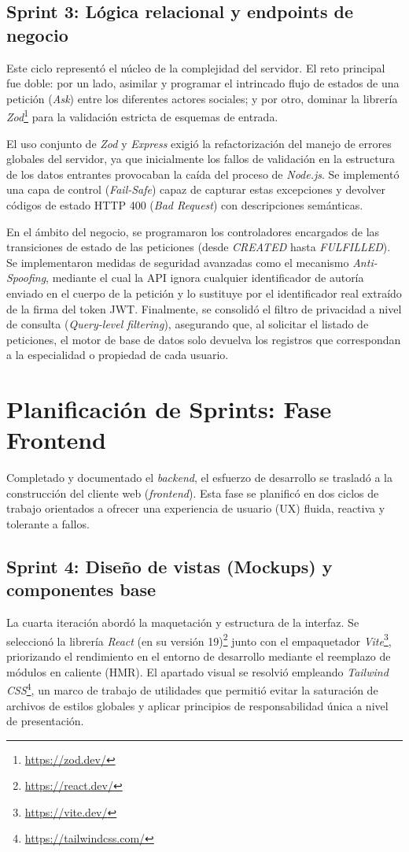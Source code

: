 \documentclass[11pt,oneside,spanish,listoffigures,listoftables]{tfgetsinf}
\begin{document}
\subsection{Sprint 3: Lógica relacional y endpoints de negocio}
Este ciclo representó el núcleo de la complejidad del servidor. El reto principal fue doble: por un lado, asimilar y programar el intrincado flujo de estados de una petición (\textit{Ask}) entre los diferentes actores sociales; y por otro, dominar la librería \textit{Zod}\footnote{\url{https://zod.dev/}} para la validación estricta de esquemas de entrada. 

El uso conjunto de \textit{Zod} y \textit{Express} exigió la refactorización del manejo de errores globales del servidor, ya que inicialmente los fallos de validación en la estructura de los datos entrantes provocaban la caída del proceso de \textit{Node.js}. Se implementó una capa de control (\textit{Fail-Safe}) capaz de capturar estas excepciones y devolver códigos de estado HTTP 400 (\textit{Bad Request}) con descripciones semánticas.

En el ámbito del negocio, se programaron los controladores encargados de las transiciones de estado de las peticiones (desde \textit{CREATED} hasta \textit{FULFILLED}). Se implementaron medidas de seguridad avanzadas como el mecanismo \textit{Anti-Spoofing}, mediante el cual la API ignora cualquier identificador de autoría enviado en el cuerpo de la petición y lo sustituye por el identificador real extraído de la firma del token JWT. Finalmente, se consolidó el filtro de privacidad a nivel de consulta (\textit{Query-level filtering}), asegurando que, al solicitar el listado de peticiones, el motor de base de datos solo devuelva los registros que correspondan a la especialidad o propiedad de cada usuario.

\section{Planificación de Sprints: Fase Frontend}

Completado y documentado el \textit{backend}, el esfuerzo de desarrollo se trasladó a la construcción del cliente web (\textit{frontend}). Esta fase se planificó en dos ciclos de trabajo orientados a ofrecer una experiencia de usuario (UX) fluida, reactiva y tolerante a fallos.

\subsection{Sprint 4: Diseño de vistas (Mockups) y componentes base}
La cuarta iteración abordó la maquetación y estructura de la interfaz. Se seleccionó la librería \textit{React} (en su versión 19)\footnote{\url{https://react.dev/}} junto con el empaquetador \textit{Vite}\footnote{\url{https://vite.dev/}}, priorizando el rendimiento en el entorno de desarrollo mediante el reemplazo de módulos en caliente (HMR). El apartado visual se resolvió empleando \textit{Tailwind CSS}\footnote{\url{https://tailwindcss.com/}}, un marco de trabajo de utilidades que permitió evitar la saturación de archivos de estilos globales y aplicar principios de responsabilidad única a nivel de presentación.
\end{document}
